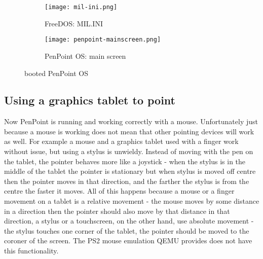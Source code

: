\begin{figure}[H]
    \centering
    \begin{subfigure}[b]{0.45\linewidth}
        \texttt{[image: mil-ini.png]}
        \caption{FreeDOS: MIL.INI}
        \label{fig:mil-ini}
    \end{subfigure}
    \hfill
    \begin{subfigure}[b]{0.45\linewidth}
        \texttt{[image: penpoint-mainscreen.png]}
        \caption{PenPoint OS: main screen}
        \label{fig:penpoint-mainscreen}
    \end{subfigure}
    \caption{booted PenPoint OS}
\end{figure}

\subsection{Using a graphics tablet to point}

Now PenPoint is running and working correctly with a mouse.  Unfortunately just
because a mouse is working does not mean that other pointing devices will work
as well.  For example a mouse and a graphics tablet used with a finger work
without issue, but using a stylus is unwieldy.  Instead of moving with the pen
on the tablet, the pointer behaves more like a joystick - when the stylus is in
the middle of the tablet the pointer is stationary but when stylus is moved off
centre then the pointer moves in that direction, and the farther the stylus is
from the centre the faster it moves.  All of this happens because a mouse or
a finger movement on a tablet is a relative movement - the mouse moves by some
distance in a direction then the pointer should also move by that distance in
that direction, a stylus or a touchscreen, on the other hand, use absolute
movement - the stylus touches one corner of the tablet, the pointer should be
moved to the coroner of the screen.  The PS2 mouse emulation QEMU provides does
not have this functionality.

